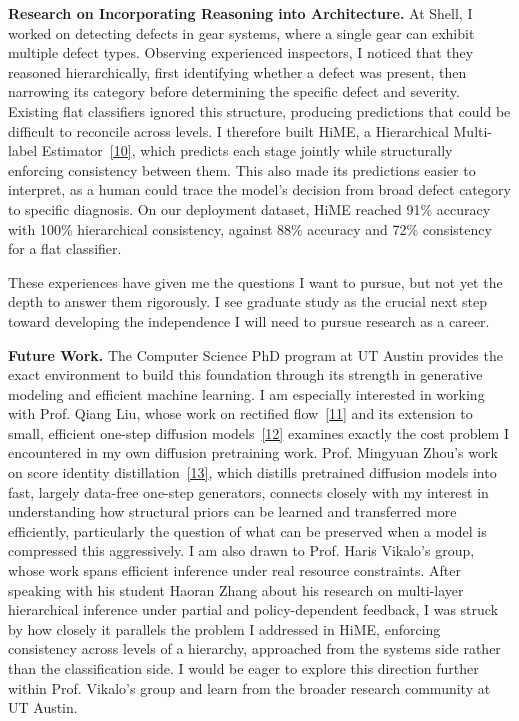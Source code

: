 \documentclass[12pt]{article}
\begin{document}
\textbf{Research on Incorporating Reasoning into Architecture.} At Shell, I worked on detecting defects in gear systems, where a single gear can exhibit multiple defect types. Observing experienced inspectors, I noticed that they reasoned hierarchically, first identifying whether a defect was present, then narrowing its category before determining the specific defect and severity. Existing flat classifiers ignored this structure, producing predictions that could be difficult to reconcile across levels. I therefore built HiME, a Hierarchical Multi-label Estimator~\hyperref[ref10]{[10]}, which predicts each stage jointly while structurally enforcing consistency between them. This also made its predictions easier to interpret, as a human could trace the model's decision from broad defect category to specific diagnosis. On our deployment dataset, HiME reached 91\% accuracy with 100\% hierarchical consistency, against 88\% accuracy and 72\% consistency for a flat classifier.

\vspace{8pt}

These experiences have given me the questions I want to pursue, but not yet the depth to answer them rigorously. I see graduate study as the crucial next step toward developing the independence I will need to pursue research as a career.

\vspace{8pt}

\textbf{Future Work.} The Computer Science PhD program at UT Austin provides the exact environment to build this foundation through its strength in generative modeling and efficient machine learning. I am especially interested in working with Prof. Qiang Liu, whose work on rectified flow~\hyperref[ref11]{[11]} and its extension to small, efficient one-step diffusion models~\hyperref[ref12]{[12]} examines exactly the cost problem I encountered in my own diffusion pretraining work. Prof. Mingyuan Zhou's work on score identity distillation~\hyperref[ref13]{[13]}, which distills pretrained diffusion models into fast, largely data-free one-step generators, connects closely with my interest in understanding how structural priors can be learned and transferred more efficiently, particularly the question of what can be preserved when a model is compressed this aggressively. I am also drawn to Prof. Haris Vikalo's group, whose work spans efficient inference under real resource constraints. After speaking with his student Haoran Zhang about his research on multi-layer hierarchical inference under partial and policy-dependent feedback, I was struck by how closely it parallels the problem I addressed in HiME, enforcing consistency across levels of a hierarchy, approached from the systems side rather than the classification side. I would be eager to explore this direction further within Prof. Vikalo's group and learn from the broader research community at UT Austin.
\end{document}
